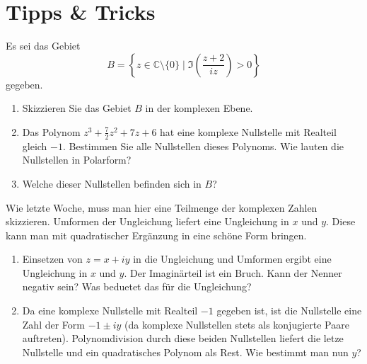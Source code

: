 \documentclass[12pt]{article}
\newcommand{\C}{\mathbb{C}}
\newenvironment{problem}[2][\textcolor{blue}{Tipps \& Tricks zu}]{\begin{trivlist}
        \item[\hskip \labelsep {\bfseries #1}\hskip \labelsep {\bfseries \textcolor{blue}{#2}.}]}{\end{trivlist}}
\newenvironment{question}[2][\textcolor{red}{Aufgabe}]{\begin{trivlist}
        \item[\hskip \labelsep {\bfseries \textcolor{red}{#1}}\hskip \labelsep {\bfseries \textcolor{red}{#2}.}]}{\end{trivlist}}
\begin{document}
\section{Tipps \& Tricks}

\begin{question}{1}
        Es sei das Gebiet
        \begin{equation}
                B=\left\{z\in\C\setminus\{0\}\mid\Im\left(\frac{z+2}{iz}\right)>0\right\}
        \end{equation}
        gegeben.
        \begin{enumerate}[label=(\alph*)]
                \item Skizzieren Sie das Gebiet $B$ in der komplexen Ebene.
                \item Das Polynom $z^3+\frac{7}{2}z^2+7z+6$ hat eine komplexe Nullstelle mit Realteil
                      gleich $-1$. Bestimmen Sie alle Nullstellen dieses Polynoms. Wie lauten die
                      Nullstellen in Polarform?
                \item Welche dieser Nullstellen befinden sich in $B$?
        \end{enumerate}
\end{question}

\begin{problem}{1} Wie letzte Woche, muss man hier eine Teilmenge der komplexen Zahlen skizzieren. Umformen der Ungleichung liefert eine Ungleichung in $x$ und $y$. Diese kann man mit quadratischer Ergänzung in eine schöne Form
        bringen.
\begin{enumerate}[label=(\alph*)]
        \item Einsetzen von $z=x+iy$ in die Ungleichung und Umformen ergibt eine Ungleichung in $x$ und $y$. Der Imaginärteil ist ein Bruch. Kann der Nenner negativ sein? Was beduetet das für die Ungleichung?
        \item Da eine komplexe Nullstelle mit Realteil $-1$ gegeben ist, ist die Nullstelle eine Zahl der Form $-1\pm{iy}$ (da komplexe Nullstellen stets als konjugierte Paare auftreten). Polynomdivision durch diese beiden Nullstellen liefert die letze Nullstelle und ein quadratisches Polynom als Rest. Wie bestimmt man nun $y$?
\end{enumerate}
\end{problem}
\end{document}
